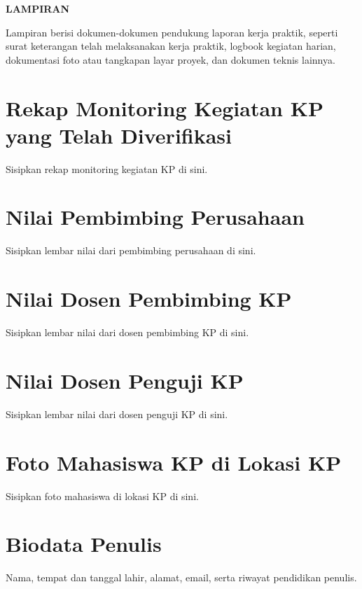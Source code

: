 \cleardoublepage
\appendix
{}
{}
\begin{center}
  {\FontJudulHalaman\bfseries LAMPIRAN\par}
\end{center}
\vspace{12pt}
\renewcommand{\thesection}{\Alph{section}}

Lampiran berisi dokumen-dokumen pendukung laporan kerja praktik, seperti surat
keterangan telah melaksanakan kerja praktik, logbook kegiatan harian, dokumentasi
foto atau tangkapan layar proyek, dan dokumen teknis lainnya.

\section{Rekap Monitoring Kegiatan KP yang Telah Diverifikasi}
Sisipkan rekap monitoring kegiatan KP di sini.

\section{Nilai Pembimbing Perusahaan}
Sisipkan lembar nilai dari pembimbing perusahaan di sini.

\section{Nilai Dosen Pembimbing KP}
Sisipkan lembar nilai dari dosen pembimbing KP di sini.

\section{Nilai Dosen Penguji KP}
Sisipkan lembar nilai dari dosen penguji KP di sini.

\section{Foto Mahasiswa KP di Lokasi KP}
Sisipkan foto mahasiswa di lokasi KP di sini.

\section{Biodata Penulis}
Nama, tempat dan tanggal lahir, alamat, email, serta riwayat pendidikan penulis.

